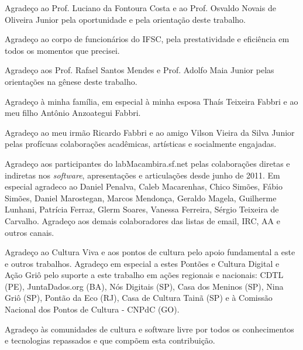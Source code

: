 

Agradeço ao Prof. Luciano da Fontoura Costa e ao Prof. Osvaldo Novais de Oliveira Junior pela oportunidade e pela orientação deste trabalho.

\vspace{4 mm}

Agradeço ao corpo de funcionários do IFSC, pela prestatividade e eficiência em todos os momentos que precisei.

\vspace{4 mm}

Agradeço aos Prof. Rafael Santos Mendes e Prof. Adolfo Maia Junior pelas orientações na gênese deste trabalho.

\vspace{4 mm}

Agradeço à minha família, em especial à minha esposa Thaís Teixeira Fabbri e ao meu filho Antônio Anzoategui Fabbri.

\vspace{4 mm}

Agradeço ao meu irmão Ricardo Fabbri e ao amigo Vilson Vieira da Silva Junior pelas profícuas colaborações acadêmicas, artísticas e socialmente engajadas.


\vspace{4 mm}

Agradeço aos participantes do labMacambira.sf.net pelas colaborações diretas e indiretas nos \emph{software}, apresentações e articulações desde junho de 2011. Em especial agradeco ao Daniel Penalva, Caleb Macarenhas, Chico Simões, Fábio Simões, Daniel Marostegan, Marcos Mendonça, Geraldo Magela, Guilherme Lunhani, Patrícia Ferraz, Glerm Soares, Vanessa Ferreira, Sérgio Teixeira de Carvalho. Agradeço aos demais colaboradores das listas de email, IRC, AA e outros canais.


\vspace{4 mm}

Agradeço ao Cultura Viva e aos pontos de cultura pelo apoio fundamental a este e outros trabalhos. Agradeço em especial a estes Pontões e Cultura Digital e Ação Griô pelo suporte a este trabalho em ações regionais e nacionais: CDTL (PE), JuntaDados.org (BA), Nós Digitais (SP), Casa dos Meninos (SP), Nina Griô (SP), Pontão da Eco (RJ), Casa de Cultura Tainã (SP) e à Comissão Nacional dos Pontos de Cultura - CNPdC (GO).


\vspace{4 mm}

Agradeço às comunidades de cultura e software livre por todos os conhecimentos e tecnologias repassados e que compõem esta contribuição. 

